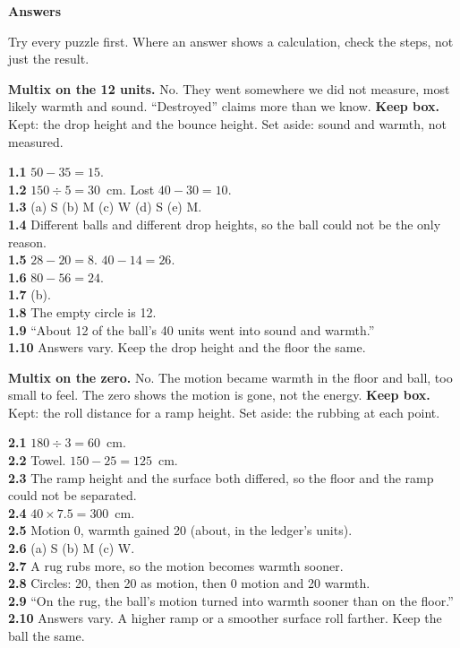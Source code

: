 \clearpage\label{answers}
{\sans\bfseries\LARGE\color{ink} Answers}\par
\footnotesize\linespread{0.94}\selectfont
Try every puzzle first. Where an answer shows a calculation, check the steps, not just the result.

\textbf{Multix on the 12 units.} No. They went somewhere we did not measure, most likely warmth and sound. ``Destroyed'' claims more than we know. \textbf{Keep box.} Kept: the drop height and the bounce height. Set aside: sound and warmth, not measured.

\textbf{1.1} $50-35=15$.\\
\textbf{1.2} $150\div5=30$~cm. Lost $40-30=10$.\\
\textbf{1.3} (a) S (b) M (c) W (d) S (e) M.\\
\textbf{1.4} Different balls and different drop heights, so the ball could not be the only reason.\\
\textbf{1.5} $28-20=8$. $40-14=26$.\\
\textbf{1.6} $80-56=24$.\\
\textbf{1.7} (b).\\
\textbf{1.8} The empty circle is 12.\\
\textbf{1.9} ``About 12 of the ball's 40 units went into sound and warmth.''\\
\textbf{1.10} Answers vary. Keep the drop height and the floor the same.

\textbf{Multix on the zero.} No. The motion became warmth in the floor and ball, too small to feel. The zero shows the motion is gone, not the energy. \textbf{Keep box.} Kept: the roll distance for a ramp height. Set aside: the rubbing at each point.

\textbf{2.1} $180\div3=60$~cm.\\
\textbf{2.2} Towel. $150-25=125$~cm.\\
\textbf{2.3} The ramp height and the surface both differed, so the floor and the ramp could not be separated.\\
\textbf{2.4} $40\times7.5=300$~cm.\\
\textbf{2.5} Motion 0, warmth gained 20 (about, in the ledger's units).\\
\textbf{2.6} (a) S (b) M (c) W.\\
\textbf{2.7} A rug rubs more, so the motion becomes warmth sooner.\\
\textbf{2.8} Circles: 20, then 20 as motion, then 0 motion and 20 warmth.\\
\textbf{2.9} ``On the rug, the ball's motion turned into warmth sooner than on the floor.''\\
\textbf{2.10} Answers vary. A higher ramp or a smoother surface roll farther. Keep the ball the same.

